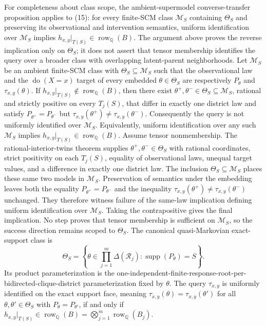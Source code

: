 For completeness about class scope, the ambient-supermodel converse-transfer proposition applies to (15): for every finite-SCM class \(\mathcal M_S\) containing \(\Theta_S\) and preserving its observational and intervention semantics, uniform identification over \(\mathcal M_S\) implies \(h_{x,y}|_{T(S)}\in\operatorname{row}_{\mathbb Q}(B)\).  The argument above proves the reverse implication only on \(\Theta_S\); it does not assert that tensor membership identifies the query over a broader class with overlapping latent-parent neighborhoods.
Let \(\mathcal M_S\) be an ambient finite-SCM class with \(\Theta_S\subseteq\mathcal M_S\) such that the observational law and the \(\operatorname{do}(X=x)\) target of every embedded \(\theta\in\Theta_S\) are respectively \(P_\theta\) and \(\tau_{x,y}(\theta)\).  If \(h_{x,y}|_{T(S)}\notin\operatorname{row}_{\mathbb Q}(B)\), then there exist \(\theta^+,\theta^-\in\Theta_S\subseteq\mathcal M_S\), rational and strictly positive on every \(T_j(S)\), that differ in exactly one district law and satisfy \(P_{\theta^+}=P_{\theta^-}\) but \(\tau_{x,y}(\theta^+)\ne\tau_{x,y}(\theta^-)\).  Consequently the query is not uniformly identified over \(\mathcal M_S\).  Equivalently, uniform identification over any such \(\mathcal M_S\) implies \(h_{x,y}|_{T(S)}\in\operatorname{row}_{\mathbb Q}(B)\).
Assume tensor nonmembership.  The rational-interior-twins theorem supplies \(\theta^+,\theta^-\in\Theta_S\) with rational coordinates, strict positivity on each \(T_j(S)\), equality of observational laws, unequal target values, and a difference in exactly one district law.  The inclusion \(\Theta_S\subseteq\mathcal M_S\) places these same two models in \(\mathcal M_S\).  Preservation of semantics under the embedding leaves both the equality \(P_{\theta^+}=P_{\theta^-}\) and the inequality \(\tau_{x,y}(\theta^+)\ne\tau_{x,y}(\theta^-)\) unchanged.  They therefore witness failure of the same-law implication defining uniform identification over \(\mathcal M_S\).  Taking the contrapositive gives the final implication.  No step proves that tensor membership is sufficient on \(\mathcal M_S\), so the success direction remains scoped to \(\Theta_S\).
The canonical quasi-Markovian exact-support class is
\[
\Theta_S=\left\{\theta\in\prod_{j=1}^m\Delta(\mathcal R_j):
\operatorname{supp}(P_\theta)=S\right\}.
\]
Its product parameterization is the one-independent-finite-response-root-per-bidirected-clique-district parameterization fixed by \(\theta\).
The query \(\tau_{x,y}\) is uniformly identified on the exact support face, meaning \(\tau_{x,y}(\theta)=\tau_{x,y}(\theta')\) for all \(\theta,\theta'\in\Theta_S\) with \(P_\theta=P_{\theta'}\), if and only if \(h_{x,y}|_{T(S)}\in\operatorname{row}_{\mathbb Q}(B)=\bigotimes_{j=1}^m\operatorname{row}_{\mathbb Q}(B_j)\).
